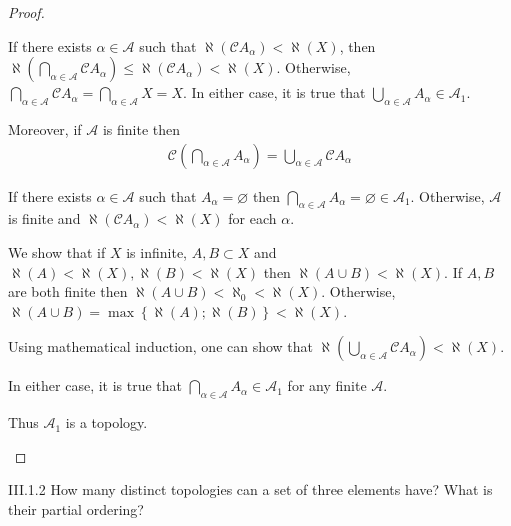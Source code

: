\begin{proof}
\begin{enumerate}[label={(\alph*)},leftmargin=*]
              If there exists \( \alpha \in \mathscr{A} \) such that \( \aleph(\mathscr{C}A_{\alpha}) < \aleph(X) \), then \( \aleph\left(\bigcap_{\alpha\in\mathscr{A}} \mathscr{C}A_{\alpha}\right) \le \aleph(\mathscr{C}A_{\alpha}) < \aleph(X) \). Otherwise, \( \bigcap_{\alpha\in\mathscr{A}} \mathscr{C}A_{\alpha} = \bigcap_{\alpha\in\mathscr{A}} X = X \). In either case, it is true that \( \bigcup_{\alpha\in\mathscr{A}} A_{\alpha} \in \mathscr{A}_{1} \).

              Moreover, if \( \mathscr{A} \) is finite then
              \begin{align*}
                  \mathscr{C}\left( \bigcap_{\alpha\in\mathscr{A}} A_{\alpha} \right) = \bigcup_{\alpha\in\mathscr{A}} \mathscr{C}A_{\alpha}
              \end{align*}

              If there exists \( \alpha \in \mathscr{A} \) such that \( A_{\alpha} = \varnothing \) then \( \bigcap_{\alpha\in\mathscr{A}} A_{\alpha} = \varnothing \in \mathscr{A}_{1} \). Otherwise, \( \mathscr{A} \) is finite and \( \aleph(\mathscr{C}A_{\alpha}) < \aleph(X) \) for each \( \alpha \).

              We show that if \( X \) is infinite, \( A, B \subset X \) and \( \aleph(A) < \aleph(X), \aleph(B) < \aleph(X) \) then \( \aleph(A \cup B) < \aleph(X) \). If \( A, B \) are both finite then \( \aleph(A \cup B) < \aleph_{0} < \aleph(X) \). Otherwise, \( \aleph(A \cup B) = \max\left\{\aleph(A); \aleph(B)\right\} < \aleph(X) \).

              Using mathematical induction, one can show that \( \aleph\left( \bigcup_{\alpha\in\mathscr{A}} \mathscr{C}A_{\alpha}\right) < \aleph(X) \).

              In either case, it is true that \( \bigcap_{\alpha\in\mathscr{A}} A_{\alpha} \in \mathscr{A}_{1} \) for any finite \( \mathscr{A} \).

              Thus \( \mathscr{A}_{1} \) is a topology.
    \end{enumerate}
\end{proof}

\begin{problem}{III.1.2}
How many distinct topologies can a set of three elements have? What is their partial ordering?
\end{problem}

